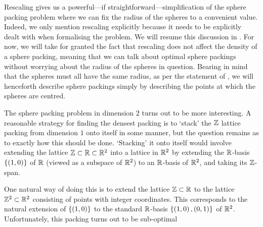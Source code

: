 Rescaling gives us a powerful---if straightforward---simplification of the sphere packing problem where we can fix the radius of the spheres to a convenient value. Indeed, we only mention rescaling explicitly because it needs to be explicitly dealt with when formalising the problem. We will resume this discussion in . For now, we will take for granted the fact that rescaling does not affect the density of a sphere packing, meaning that we can talk about optimal sphere packings without worrying about the radius of the spheres in question. Bearing in mind that the spheres must all have the same radius, as per the statement of , we will henceforth describe sphere packings simply by describing the points at which the spheres are centred.

The sphere packing problem in dimension $2$ turns out to be more interesting. A reasonable strategy for finding the densest packing is to `stack' the $\mathbb{Z}$ lattice packing from dimension $1$ onto itself in some manner, but the question remains as to exactly how this should be done. `Stacking' it onto itself would involve extending the lattice $\mathbb{Z} \subset \mathbb{R} \subset \mathbb{R}^2$ into a lattice in $\mathbb{R}^2$ by extending the $\mathbb{R}$-basis $\left\{ \left( 1, 0 \right) \right\}$ of $\mathbb{R}$ (viewed as a subspace of $\mathbb{R}^2$) to an $\mathbb{R}$-basis of $\mathbb{R}^2$, and taking its $\mathbb{Z}$-span.

One natural way of doing this is to extend the lattice $\mathbb{Z} \subset \mathbb{R}$ to the lattice $\mathbb{Z}^2 \subset \mathbb{R}^2$ consisting of points with integer coordinates. This corresponds to the natural extension of $\left\{ \left( 1, 0 \right) \right\}$ to the standard $\mathbb{R}$-basis $\left\{ \left( 1, 0 \right), \left( 0, 1 \right) \right\}$ of $\mathbb{R}^2$. Unfortunately, this packing turns out to be sub-optimal  